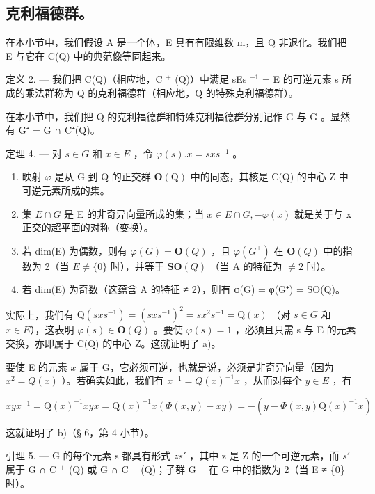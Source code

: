 \subsection{克利福德群。}

在本小节中，我们假设 A 是一个体，E 具有有限维数 m，且 Q 非退化。我们把 E 与它在 C(Q) 中的典范像等同起来。

定义 2. --- 我们把 C(Q)（相应地，C \(^{+}\) (Q)）中满足 sEs \(^{-1}\) = E 的可逆元素 s 所成的乘法群称为 Q 的克利福德群（相应地，Q 的特殊克利福德群）。

在本小节中，我们把 Q 的克利福德群和特殊克利福德群分别记作 G 与 G⁺。显然有 G⁺ = G ∩ C⁺(Q)。

定理 4. --- 对 \(s \in G\) 和 \(x \in E\) ，令 \(\varphi(s). x = sxs^{-1}\) 。

\begin{enumerate}
\def\labelenumi{\alph{enumi})}
\item
  映射 \(\varphi\) 是从 G 到 Q 的正交群 \(\mathbf{O}(\mathrm{Q})\) 中的同态，其核是 C(Q) 的中心 Z 中可逆元素所成的集。
\item
  集 \(E \cap G\) 是 E 的非奇异向量所成的集；当 \(x \in E \cap G, -\varphi(x)\) 就是关于与 x 正交的超平面的对称（变换）。
\item
  若 dim(E) 为偶数，则有 \(\varphi(G) = \mathbf{O}(Q)\) ，且 \(\varphi(G^{+})\) 在 \(\mathbf{O}(Q)\) 中的指数为 2（当 \(E \neq \{0\}\) 时），并等于 \(\mathbf{SO}(Q)\) （当 A 的特征为 \(\neq 2\) 时）。
\item
  若 dim(E) 为奇数（这蕴含 A 的特征 ≠ 2），则有 φ(G) = φ(G⁺) = SO(Q)。
\end{enumerate}

实际上，我们有 \(\mathrm{Q}(sxs^{-1}) = (sxs^{-1})^2 = sx^2s^{-1} = \mathrm{Q}(x)\) （对 \(s \in G\) 和 \(x \in E\)），这表明 \(\varphi(s) \in \mathbf{O}(Q)\) 。要使 \(\varphi(s) = 1\) ，必须且只需 s 与 E 的元素交换，亦即属于 C(Q) 的中心 Z。这就证明了 a)。

要使 E 的元素 \(x\) 属于 G，它必须可逆，也就是说，必须是非奇异向量（因为 \(x^2 = Q(x)\) ）。若确实如此，我们有 \(x^{-1} = Q(x)^{-1}x\) ，从而对每个 \(y \in E\) ，有

\[
x y x ^ {- 1} = \mathrm{Q} (x) ^ {- 1} x y x = \mathrm{Q} (x) ^ {- 1} x (\Phi (x, y) - x y) = - (y - \Phi (x, y) \mathrm{Q} (x) ^ {- 1} x)
\]

这就证明了 b)（§ 6，第 4 小节）。

引理 5. --- G 的每个元素 s 都具有形式 \(zs'\) ，其中 z 是 Z 的一个可逆元素，而 \(s'\) 属于 G ∩ C \(^{+}\) (Q) 或 G ∩ C \(^{-}\) (Q)；子群 G \(^{+}\) 在 G 中的指数为 2（当 E ≠ \{0\} 时）。

